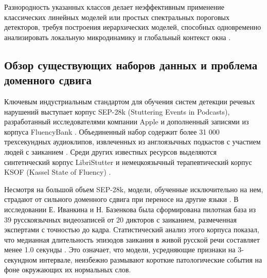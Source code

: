 \documentclass[a4paper,14pt]{extarticle}
\begin{document}
	Разнородность указанных классов делает неэффективным применение классических линейных моделей или простых спектральных пороговых детекторов, требуя построения иерархических моделей, способных одновременно анализировать локальную микродинамику и глобальный контекст окна \cite{tcn}.
	
	\subsection{Обзор существующих наборов данных и проблема доменного сдвига}
	Ключевым индустриальным стандартом для обучения систем детекции речевых нарушений выступает корпус SEP-28k (Stuttering Events in Podcasts), разработанный исследователями компании Apple и дополненный записями из корпуса FluencyBank \cite{sep28k}. Объединенный набор содержит более 31 000 трехсекундных аудиоклипов, извлеченных из англоязычных подкастов с участием людей с заиканием \cite{sep28k}. Среди других известных ресурсов выделяются синтетический корпус LibriStutter и немецкоязычный терапевтический корпус KSOF (Kassel State of Fluency) \cite{ivankin, sep28k}.
	
	Несмотря на большой объем SEP-28k, модели, обученные исключительно на нем, страдают от сильного доменного сдвига при переносе на другие языки \cite{ivankin}. В исследовании Е. Иванкина и Н. Базенкова \cite{ivankin} была сформирована пилотная база из 39 русскоязычных видеозаписей от 20 дикторов с заиканием, размеченная экспертами с точностью до кадра. Статистический анализ этого корпуса показал, что медианная длительность эпизодов заикания в живой русской речи составляет менее 1.0 секунды \cite{ivankin}. Это означает, что модели, усредняющие признаки на 3-секундном интервале, неизбежно размывают короткие патологические события на фоне окружающих их нормальных слов.
	
\end{document}
